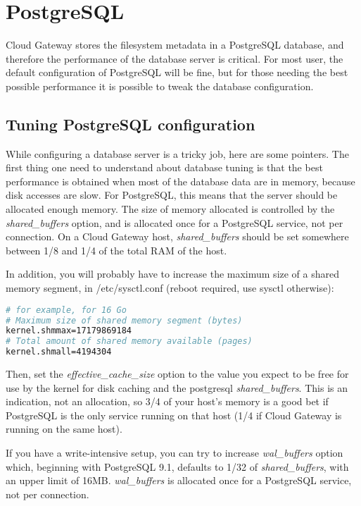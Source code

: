 \documentclass[11pt,fleqn,openany]{book} %
\begin{document}
\section{PostgreSQL}
\label{sec:postgresql}

Cloud Gateway stores the filesystem metadata in a PostgreSQL database, and therefore the performance of the database server is critical.
For most user, the default configuration of PostgreSQL will be fine, but for those needing the best possible performance it is possible
to tweak the database configuration.

\subsection{Tuning PostgreSQL configuration}

While configuring a database server is a tricky job, here are some pointers. The first thing one need to understand about database tuning is that the best performance is obtained when most of the database data
are in memory, because disk accesses are slow. For PostgreSQL, this means that the server should be allocated enough memory. The size of memory allocated is controlled by the \textit{shared\_buffers}
option, and is allocated once for a PostgreSQL service, not per connection. On a Cloud Gateway host, \textit{shared\_buffers} should be set somewhere between 1/8 and 1/4 of the total RAM of the host.

In addition, you will probably have to increase the maximum size of a shared memory segment, in /etc/sysctl.conf (reboot required, use sysctl otherwise):

\begin{lstlisting}[language=bash]
# for example, for 16 Go
# Maximum size of shared memory segment (bytes)
kernel.shmmax=17179869184
# Total amount of shared memory available (pages)
kernel.shmall=4194304
\end{lstlisting}

Then, set the \textit{effective\_cache\_size} option to the value you expect to be free for use by the kernel for disk caching and the postgresql \textit{shared\_buffers}.
This is an indication, not an allocation, so 3/4 of your host's memory is a good bet if PostgreSQL is the only service running on that host (1/4 if Cloud Gateway is running on the same host).

If you have a write-intensive setup, you can try to increase \textit{wal\_buffers} option which, beginning with PostgreSQL 9.1, defaults to 1/32 of \textit{shared\_buffers},
 with an upper limit of 16MB. \textit{wal\_buffers} is allocated once for a PostgreSQL service, not per connection.\\
\end{document}
